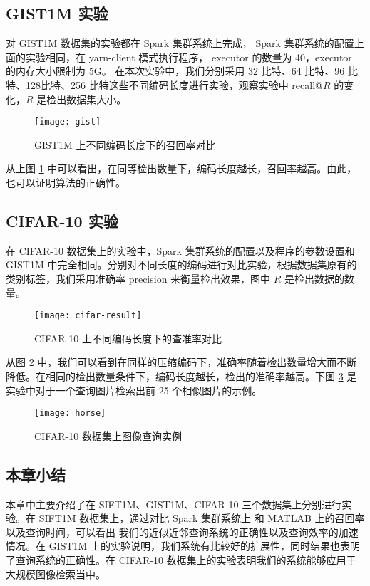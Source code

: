 \subsection{GIST1M 实验}
对 GIST1M 数据集的实验都在 Spark 集群系统上完成， Spark 集群系统的配置上面的实验相同，在 yarn-client 模式执行程序， executor 的数量为 40，executor 的内存大小限制为 5G。 在本次实验中，我们分别采用 32 比特、64 比特、96 比特、128比特、256 比特这些不同编码长度进行实验，观察实验中 recall@$R$ 的变化，$R$ 是检出数据集大小。
\begin{figure}[H]
  \centering
  \texttt{[image: gist]}
  \caption{GIST1M 上不同编码长度下的召回率对比}
  \label{fig:gist}
\end{figure}
从上图 \ref{fig:gist} 中可以看出，在同等检出数量下，编码长度越长，召回率越高。由此，也可以证明算法的正确性。
\subsection{CIFAR-10 实验}
在 CIFAR-10 数据集上的实验中，Spark 集群系统的配置以及程序的参数设置和 GIST1M 中完全相同。分别对不同长度的编码进行对比实验，根据数据集原有的类别标签，我们采用准确率 precision 来衡量检出效果，图中 $R$ 是检出数据的数量。
\begin{figure}[H]
  \centering
  \texttt{[image: cifar-result]}
  \caption{CIFAR-10 上不同编码长度下的查准率对比}
  \label{fig:cifar-result}
\end{figure}
从图 \ref{fig:cifar-result} 中，我们可以看到在同样的压缩编码下，准确率随着检出数量增大而不断降低。在相同的检出数量条件下，编码长度越长，检出的准确率越高。下图 \ref{fig:horse} 是实验中对于一个查询图片检索出前 25 个相似图片的示例。
\begin{figure}[H]
  \centering
  \texttt{[image: horse]}
  \caption{CIFAR-10 数据集上图像查询实例}
  \label{fig:horse}
\end{figure}
\subsection{本章小结}
本章中主要介绍了在 SIFT1M、GIST1M、CIFAR-10 三个数据集上分别进行实验。在 SIFT1M 数据集上，通过对比 Spark 集群系统上 和 MATLAB 上的召回率以及查询时间，可以看出 我们的近似近邻查询系统的正确性以及查询效率的加速情况。在 GIST1M 上的实验说明，我们系统有比较好的扩展性，同时结果也表明了查询系统的正确性。在 CIFAR-10 数据集上的实验表明我们的系统能够应用于大规模图像检索当中。
